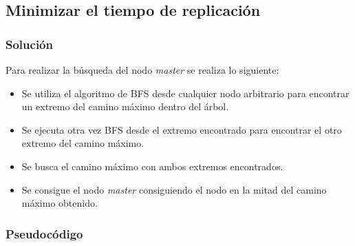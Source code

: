 \documentclass[a4paper, 10pt, twoside]{article}
\begin{document}
\subsection{Minimizar el tiempo de replicación}

\subsubsection{Solución}

Para realizar la búsqueda del nodo \textit{master} se realiza lo siguiente:

\begin{itemize}
\item Se utiliza el algoritmo de BFS desde cualquier nodo arbitrario para encontrar un extremo del camino máximo dentro del árbol.
\item Se ejecuta otra vez BFS desde el extremo encontrado para encontrar el otro extremo del camino máximo.
\item Se busca el camino máximo con ambos extremos encontrados.
\item Se consigue el nodo \textit{master} consiguiendo el nodo en la mitad del camino máximo obtenido.
\end{itemize}

\subsubsection{Pseudocódigo}
\end{document}
